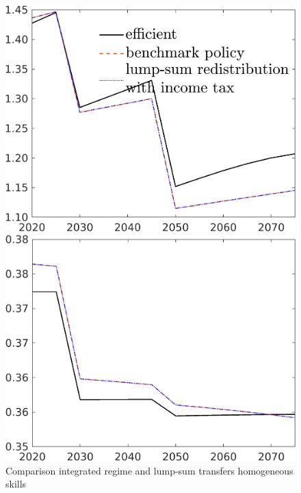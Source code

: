 \begin{figure}[h!!]
	\centering
	\caption{Comparison integrated regime and lump-sum transfers homogeneous skills}\label{fig:bench_lumpsum_noskill}
	
	\begin{minipage}[]{0.32\textwidth}
		\includegraphics[width=1\textwidth]{../../codding_model/own_basedOnFried/optimalPol_190722_tidiedUp/figures/all_July22/C_CompEffOPT_T_NoTaus_pol4_spillover0_noskill1_sep1_xgrowth0_etaa0.79_lgd1_lff0.png}
	\end{minipage}
	\begin{minipage}[]{0.32\textwidth}
		\includegraphics[width=1\textwidth]{../../codding_model/own_basedOnFried/optimalPol_190722_tidiedUp/figures/all_July22/hh_CompEffOPT_T_NoTaus_pol4_spillover0_noskill1_sep1_xgrowth0_etaa0.79_lgd0_lff0.png}

\end{minipage}
\end{figure}
